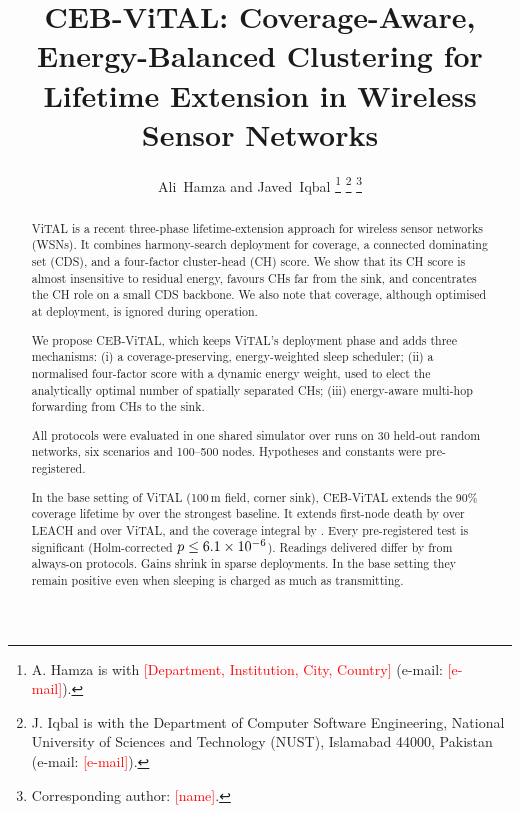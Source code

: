 \documentclass[journal]{IEEEtran}
\newcommand{\todo}[1]{\textcolor{red}{[#1]}}
\begin{document}
\title{CEB-ViTAL: Coverage-Aware, Energy-Balanced Clustering for Lifetime Extension in Wireless Sensor Networks}

\author{Ali~Hamza and Javed~Iqbal%
\thanks{A. Hamza is with \todo{Department, Institution, City, Country} (e-mail: \todo{e-mail}).}%
\thanks{J. Iqbal is with the Department of Computer Software Engineering, National University of Sciences and Technology (NUST), Islamabad 44000, Pakistan (e-mail: \todo{e-mail}).}%
\thanks{Corresponding author: \todo{name}.}}

\markboth{\todo{Journal name}}{Hamza and Iqbal: CEB-ViTAL}

\maketitle

\begin{abstract}
ViTAL is a recent three-phase lifetime-extension approach for wireless sensor networks (WSNs). It combines harmony-search deployment for coverage, a connected dominating set (CDS), and a four-factor cluster-head (CH) score. We show that its CH score is almost insensitive to residual energy, favours CHs far from the sink, and concentrates the CH role on a small CDS backbone. We also note that coverage, although optimised at deployment, is ignored during operation.

We propose CEB-ViTAL, which keeps ViTAL's deployment phase and adds three mechanisms:
(i) a coverage-preserving, energy-weighted sleep scheduler;
(ii) a normalised four-factor score with a dynamic energy weight, used to elect the analytically optimal number of spatially separated CHs;
(iii) energy-aware multi-hop forwarding from CHs to the sink.

All protocols were evaluated in one shared simulator over \NRuns{} runs on 30 held-out random networks, six scenarios and 100--500 nodes. Hypotheses and constants were pre-registered.

In the base setting of ViTAL (100\,m field, corner sink), CEB-ViTAL extends the 90\% coverage lifetime by \TninetyBest{} over the strongest baseline. It extends first-node death by \FNDLeach{} over LEACH and \FNDVital{} over ViTAL, and the coverage integral by \CovBest{}. Every pre-registered test is significant (Holm-corrected $p\le6.1\times10^{-6}$). Readings delivered differ by \ReadAll{} from always-on protocols. Gains shrink in sparse deployments. In the base setting they remain positive even when sleeping is charged as much as transmitting.
\end{abstract}
\end{document}
